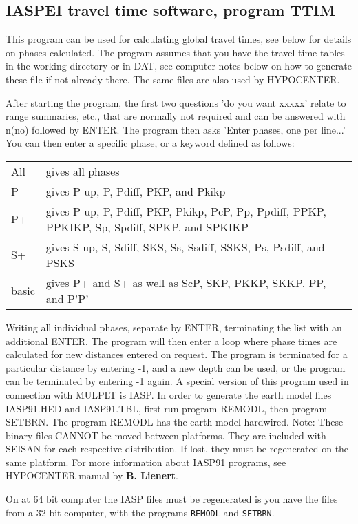 
\subsection{IASPEI travel time software, program TTIM} 

This program can be used for calculating global travel times, see below for details on phases calculated. The program assumes that you have the travel time tables in the working directory or in DAT, see computer notes below on how to generate these file if not already there. The same files are also used by HYPOCENTER. 

After starting the program, the first two questions 'do you want xxxxx' relate to range summaries, etc., that are normally not required and can be answered with n(no) followed by ENTER. The program then asks 'Enter phases, one per line...' You can then enter a specific phase, or a keyword defined as follows:  


\begin{tabular}{lp{10cm}}
All & gives all phases \\
P & gives P-up, P, Pdiff, PKP, and Pkikp \\
P+ & gives P-up, P, Pdiff, PKP, Pkikp, PcP, Pp, Ppdiff, PPKP, 
PPKIKP, Sp, Spdiff, SPKP, and SPKIKP \\
S+ & gives S-up, S, Sdiff, SKS, Ss, Ssdiff, SSKS, Ps, Psdiff, and PSKS \\
basic & gives P+ and S+ as well as ScP, SKP, PKKP, SKKP, PP, and P'P' \\
\end{tabular}

Writing all individual phases, separate by ENTER, terminating the 
list with an additional ENTER.  The program will then enter a loop 
where phase times are calculated for new distances entered on request. 
The program is terminated for a particular distance by entering -1, 
and a new depth can be used, or the program can be terminated by entering -1 again. \newline
A special version of this program used in connection with MULPLT is IASP. \newline
In order to generate the earth model files IASP91.HED 
and IASP91.TBL, first run program REMODL, then program SETBRN. The 
program REMODL has the earth model hardwired. Note: These binary files 
CANNOT be moved between platforms. They are included with SEISAN for 
each respective distribution. If lost, they must be regenerated on 
the same platform.  \newline
For more information about IASP91 programs, see HYPOCENTER manual by \textbf{B. Lienert}. 

On at  64 bit 
computer the IASP files must be regenerated 
is you have the files from a 32 bit computer, with the programs \texttt{REMODL} and 
\texttt{SETBRN}. 


